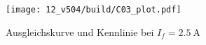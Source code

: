 \begin{figure}[h]
    \centering
    \texttt{[image: 12\_v504/build/C03\_plot.pdf]}
    \caption{Ausgleichskurve und Kennlinie bei $I_f = \qty{2.5}{\ampere}$}
    \label{fig:c03}
\end{figure}